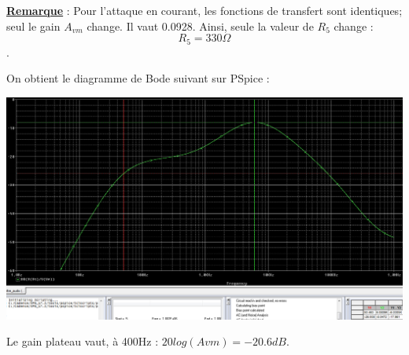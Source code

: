 \documentclass[a4paper]{report}
\begin{document}
\textbf{\underline{Remarque}} :
\newline
\newline
Pour l'attaque en courant, les fonctions de transfert sont identiques; seul le gain $A_{vm}$ change. Il vaut 0.0928. Ainsi, seule la valeur de $R_5$ change :
$$R_5 = 330\Omega$$.

On obtient le diagramme de Bode suivant sur PSpice :

\begin{center}
\includegraphics[width=1\textwidth]{bode_filtre.PNG}
\end{center}

Le gain plateau vaut, à 400Hz : $20log(Avm) = -20.6dB$.
\end{document}
